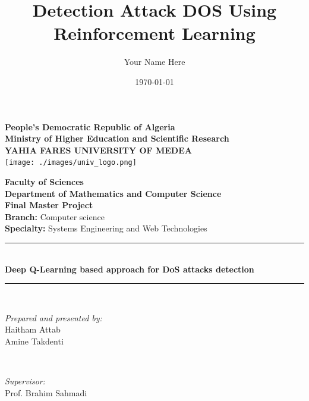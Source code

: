 \documentclass[12pt]{report}
\title{\Huge{\textbf{Detection Attack DOS Using Reinforcement Learning}}}
\author{Your Name Here}
\date{\today}
\begin{document}
\begin{center}
    \textbf{\LARGE People’s Democratic Republic of Algeria}\\[0.2cm]
    \textbf{\large Ministry of Higher Education and Scientific Research}\\[0.2cm]
    \textbf{\Large YAHIA FARES UNIVERSITY OF MEDEA}\\[1cm]

    \texttt{[image: ./images/univ\_logo.png]}\par\vspace{1.5cm}

    \textbf{\Large Faculty of Sciences}\\[0.5cm]
    \textbf{Department of Mathematics and Computer Science}\\[1cm]

    \textbf{\Huge Final Master Project}\\[1.2cm]

    \textbf{\large Branch:} Computer science\\[0.3cm]
    \textbf{\large Specialty:} Systems Engineering and Web Technologies\\[1cm]

    \rule{\linewidth}{0.5mm} \\[0.4cm]
    { \Huge \bfseries Deep Q-Learning based approach for DoS attacks detection \\[0.4cm] }
    \rule{\linewidth}{0.5mm} \\[1.5cm]

    \begin{minipage}{0.4\textwidth}
        \begin{flushleft} \large
            \emph{Prepared and presented by:}\\
            Haitham Attab \\
            Amine Takdenti
        \end{flushleft}
    \end{minipage}~
    \begin{minipage}{0.4\textwidth}
        \begin{flushright} \large
            \emph{Supervisor:}\\
            Prof. Brahim Sahmadi
        \end{flushright}
    \end{minipage}\\[2cm]
\end{center}
\end{document}
